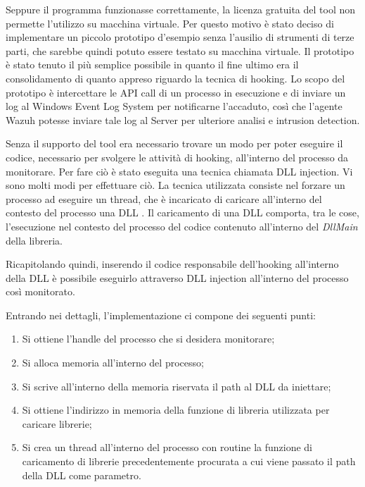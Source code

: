 Seppure il programma funzionasse correttamente, la licenza gratuita del tool non permette l'utilizzo su macchina virtuale. Per questo motivo è stato deciso di implementare un piccolo prototipo d'esempio senza l'ausilio di strumenti di terze parti, che sarebbe quindi potuto essere testato su macchina virtuale. Il prototipo è stato tenuto il più semplice possibile in quanto il fine ultimo era il consolidamento di quanto appreso riguardo la tecnica di hooking.
Lo scopo del prototipo è intercettare le API call di un  processo in esecuzione e di inviare un log al Windows Event Log System per notificarne l'accaduto, così che l'agente Wazuh potesse inviare tale log al Server per ulteriore analisi e intrusion detection.

\medskip
Senza il supporto del tool era necessario trovare un modo per poter eseguire il codice, necessario per svolgere le attività di hooking, all'interno del processo da monitorare.
Per fare ciò è stato eseguita una tecnica chiamata DLL injection. Vi sono molti modi per effettuare ciò.
La tecnica utilizzata consiste nel forzare un processo ad eseguire un thread, che è incaricato di caricare  all'interno del contesto del processo una DLL \cite{dllinjection}. Il caricamento di una DLL comporta, tra le cose, l'esecuzione nel contesto del processo del codice contenuto all'interno del \textit{DllMain} della libreria. 

Ricapitolando quindi, inserendo  il codice responsabile dell'hooking all'interno della DLL è possibile eseguirlo attraverso DLL injection all'interno del processo così monitorato.

Entrando nei dettagli, l'implementazione ci compone dei seguenti punti:
\begin{enumerate}
    \item Si ottiene l'handle del processo che si desidera monitorare;
    \item Si alloca memoria all'interno del processo;
    \item Si scrive all'interno della memoria riservata  il path al DLL da iniettare;
    \item Si ottiene l'indirizzo in memoria della funzione di libreria utilizzata per caricare librerie;
    \item Si crea un thread all'interno del processo con routine la funzione di caricamento di librerie precedentemente procurata a cui viene passato il path della DLL come parametro.
\end{enumerate}

